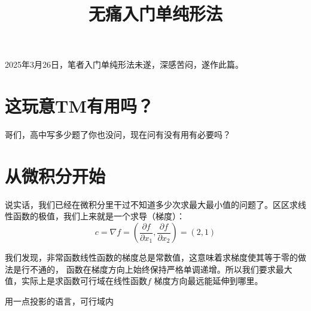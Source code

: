 \documentclass{article}
\title{无痛入门单纯形法}
\author{}
\begin{document}
\maketitle

2025年3月26日，笔者入门单纯形法未遂，深感苦闷，遂作此篇。

\section{这玩意TM有用吗？}
哥们，高中写多少题了你也没问，现在问有没有用有必要吗？

\section{从微积分开始}

说实话，我们已经在微积分里干过不知道多少次求最大最小值的问题了。区区求线性函数的极值，我们上来就是一个求导（梯度）：
\[
    c = \nabla f =\left( \frac{\partial f}{\partial x_1},
    \frac{\partial f}{\partial x_2} \right) = (2,1)
\]

我们发现，非常函数线性函数的梯度总是常数值，这意味着求梯度使其等于零的做法是行不通的，
函数在梯度方向上始终保持严格单调递增。所以我们要求最大值，实际上是求函数可行域在线性函数\(f\) 梯度方向最远能延伸到哪里。

用一点投影的语言，可行域内
\end{document}
